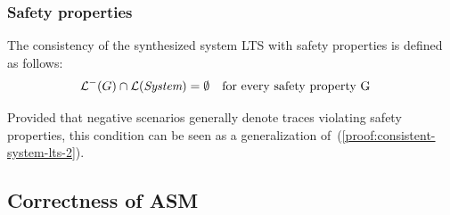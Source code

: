 \subsubsection*{Safety properties}

The consistency of the synthesized system LTS with safety properties is defined as follows:
\begin{align*}
&\mathcal{L}^-(G) \cap \mathcal{L}(\emph{System}) = \emptyset \mbox{~~~for every safety property~G}
\end{align*}

Provided that negative scenarios generally denote traces violating safety properties, this condition can be seen as a generalization of~(\ref{proof:consistent-system-lts-2}).


\subsection{Correctness of ASM\label{subsection:correctness-of-asm}}


